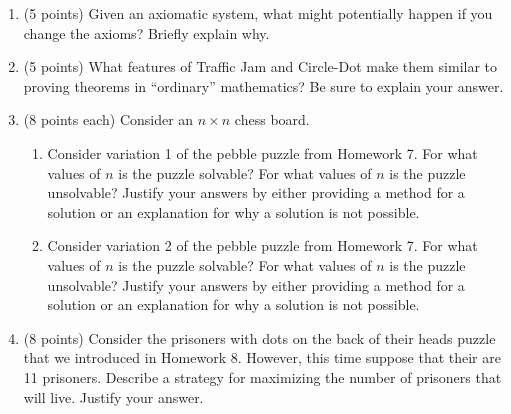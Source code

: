\documentclass[11pt]{article}
\theoremstyle{definition}
\begin{document}
\begin{enumerate}

%
%
%
%
%
%

\item (5 points)  Given an axiomatic system, what might potentially happen if you change the axioms?  Briefly explain why.

\vfill

\item (5 points)  What features of Traffic Jam and Circle-Dot make them similar to proving theorems in ``ordinary'' mathematics?  Be sure to explain your answer.

\vfill

\item (8 points each) Consider an $n\times n$ chess board.

\begin{enumerate}
\item Consider variation 1 of the pebble puzzle from Homework 7.  For what values of $n$ is the puzzle solvable?  For what values of $n$ is the puzzle unsolvable?  Justify your answers by either providing a method for a solution or an explanation for why a solution is not possible.

\vfill

\vfill

\item Consider variation 2 of the pebble puzzle from Homework 7.  For what values of $n$ is the puzzle solvable?  For what values of $n$ is the puzzle unsolvable?  Justify your answers by either providing a method for a solution or an explanation for why a solution is not possible.

\vfill

\vfill

\end{enumerate}

\newpage

\item (8 points)  Consider the prisoners with dots on the back of their heads puzzle that we introduced in Homework 8.  However, this time suppose that their are 11 prisoners.  Describe a strategy for maximizing the number of prisoners that will live.  Justify your answer.


\end{enumerate}
\end{document}
